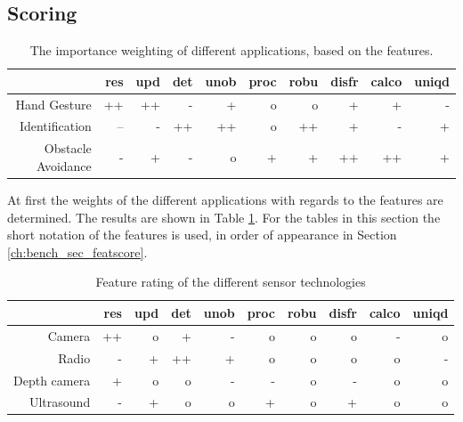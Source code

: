 \subsection{Scoring}
\begin{table}[htbp]
  \centering
  \caption{The importance weighting of different applications, based on the features.}
    \begin{tabular}{rrrrrrrrrr}
    \toprule
          & res   & upd   & det   & unob  & proc  & robu  & disfr & calco & uniqd \\
    \midrule
    Hand Gesture & ++    & ++    & -     & +     & o     & o     & +     & +     & - \\
    Identification & --    & -     & ++    & ++    & o     & ++    & +     & -     & + \\
    Obstacle Avoidance & -     & +     & -     & o     & +     & +     & ++    & ++    & + \\
    \bottomrule
    \end{tabular}%
  \label{tab:bench_appweights}%
\end{table}%
At first the weights of the different applications with regards to the features are determined. The results are shown in Table \ref{tab:bench_appweights}. For the tables in this section the short notation of the features is used, in order of appearance in Section \ref{ch:bench_sec_featscore}.
\begin{table}[htbp]
  \centering
  \caption{Feature rating of the different sensor technologies}
    \begin{tabular}{rrrrrrrrrr}
    \toprule
          & res   & upd   & det   & unob  & proc  & robu  & disfr & calco & uniqd \\
    \midrule
    Camera & ++    & o     & +     & -     & o     & o     & o     & -     & o \\
    Radio & -     & +     & ++    & +     & o     & o     & o     & o     & - \\
    Depth camera & +     & o     & o     & -     & -     & o     & -     & o     & o \\
    Ultrasound & -     & +     & o     & o     & +     & o     & +     & o     & o \\
    \bottomrule
    \end{tabular}
  \label{tab:bench_feature_rating}
\end{table}
